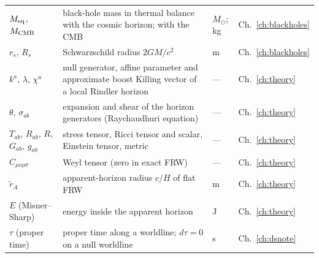 {\begin{longtable}{@{}>{\raggedright\arraybackslash}p{}>{\raggedright\arraybackslash}p{}>{\raggedright\arraybackslash}p{}>{\raggedright\arraybackslash}p{}@{}}
$M_{\rm eq}$, $M_{\rm CMB}$ & black-hole mass in thermal balance with the cosmic horizon; with the CMB & $M_\odot$; kg & Ch.~\ref{ch:blackholes}\\\iamrowrule
$r_s$, $R_s$ & Schwarzschild radius $2GM/c^2$ & m & Ch.~\ref{ch:blackholes}\\\iamrowrule
$k^a$, $\lambda$, $\chi^a$ & null generator, affine parameter and approximate boost Killing vector of a local Rindler horizon & --- & Ch.~\ref{ch:theory}\\\iamrowrule
$\theta$, $\sigma_{ab}$ & expansion and shear of the horizon generators (Raychaudhuri equation) & --- & Ch.~\ref{ch:theory}\\\iamrowrule
$T_{ab}$, $R_{ab}$, $R$, $G_{ab}$, $g_{ab}$ & stress tensor, Ricci tensor and scalar, Einstein tensor, metric & --- & Ch.~\ref{ch:theory}\\\iamrowrule
$C_{\mu\nu\rho\sigma}$ & Weyl tensor (zero in exact FRW) & --- & Ch.~\ref{ch:theory}\\\iamrowrule
$\tilde r_A$ & apparent-horizon radius $c/H$ of flat FRW & m & Ch.~\ref{ch:theory}\\\iamrowrule
$E$ (Misner--Sharp) & energy inside the apparent horizon & J & Ch.~\ref{ch:theory}\\\iamrowrule
$\tau$ (proper time) & proper time along a worldline; $d\tau=0$ on a null worldline & s & Ch.~\ref{ch:dsnote}\\
\bottomrule\end{longtable}}
